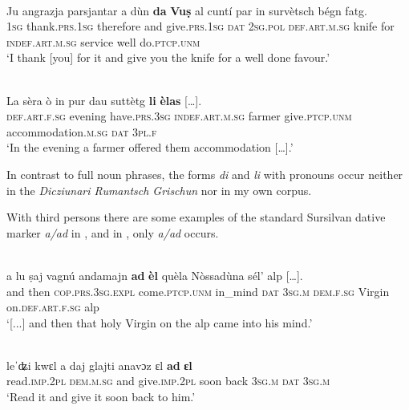 \ea\label{}
\\
\gll  Ju angrazja parsjantar a dùn \textbf{da} \textbf{Vuṣ} al cuntí par in survètsch bégn fatg.\\
    \textsc{1sg} thank.\textsc{prs.1sg} therefore and give.\textsc{prs.1sg} \textsc{dat} \textsc{2sg.pol} \textsc{def.art.m.sg} knife for \textsc{indef.art.m.sg} service well do.\textsc{ptcp.unm}\\
\glt `I thank [you] for it and give you the knife for a well done favour.'
\z

 \ea\label{}
\\
\gll  La sèra ò in pur dau suttètg \textbf{li} \textbf{èlas} […].\\
     \textsc{def}.\textsc{art}.\textsc{f}.\textsc{sg} evening have.\textsc{prs}.3\textsc{sg} \textsc{indef}.\textsc{art}.\textsc{m}.\textsc{sg} farmer give.\textsc{ptcp.unm} accommodation.\textsc{m.sg} \textsc{dat} \textsc{3pl.f}\\
\glt `In the evening a farmer offered them accommodation […].'
\z

In contrast to full noun phrases, the forms \textit{di} and \textit{li} with pronouns occur neither in the \textit{Dicziunari Rumantsch Grischun} nor in my own corpus.

With third persons there are some examples of the standard Sursilvan dative marker \textit{a/ad} in \citet{Büchli1966}, and in \citet{Gartner1910}, only \textit{a/ad} occurs.

\ea\label{}
\\
\gll  […] a lu ṣaj vagnú andamajn \textbf{ad} \textbf{èl} quèla Nòssadùna sél’ alp […].\\
{} and then \textsc{cop.prs.3sg.expl} come.\textsc{ptcp.unm} in\_mind \textsc{dat} \textsc{3sg.m} \textsc{dem.f.sg} Virgin on.\textsc{def.art.f.sg} alp \\
\glt `[...] and then that holy Virgin on the alp came into his mind.'
\z

\ea\label{}
\\
\gll leˈʥi kwɛl a daj glajti anavɔz ɛl \textbf{ad} \textbf{ɛl}\\
     read.\textsc{imp.2pl} \textsc{dem.m.sg} and give.\textsc{imp.2pl} soon back \textsc{3sg.m} \textsc{dat} \textsc{3sg.m}\\
\glt `Read it and give it soon back to him.'
\z

